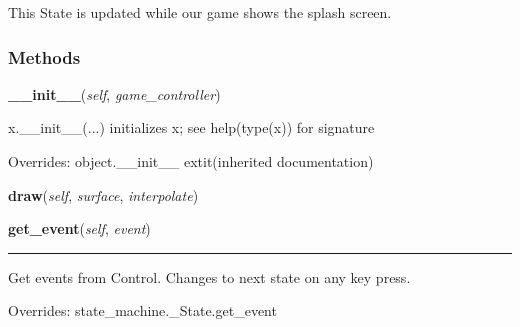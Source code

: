 This State is updated while our game shows the splash screen.



  \subsubsection{Methods}

    \vspace{0.5ex}

\hspace{.8\funcindent}\begin{boxedminipage}{\funcwidth}

    \raggedright \textbf{\_\_init\_\_}(\textit{self}, \textit{game\_controller})

\setlength{\parskip}{2ex}
    x.\_\_init\_\_(...) initializes x; see help(type(x)) for signature

\setlength{\parskip}{1ex}
      Overrides: object.\_\_init\_\_ 	extit{(inherited documentation)}

    \end{boxedminipage}

    \label{pygame-asteroids:states:franchise:Franchise:draw}

    \vspace{0.5ex}

\hspace{.8\funcindent}\begin{boxedminipage}{\funcwidth}

    \raggedright \textbf{draw}(\textit{self}, \textit{surface}, \textit{interpolate})

\setlength{\parskip}{2ex}
\setlength{\parskip}{1ex}
    \end{boxedminipage}

    \vspace{0.5ex}

\hspace{.8\funcindent}\begin{boxedminipage}{\funcwidth}

    \raggedright \textbf{get\_event}(\textit{self}, \textit{event})

    \vspace{-1.5ex}

    \rule{\textwidth}{0.5\fboxrule}
\setlength{\parskip}{2ex}
    Get events from Control. Changes to next state on any key press.

\setlength{\parskip}{1ex}
      Overrides: state\_machine.\_State.get\_event

    \end{boxedminipage}

